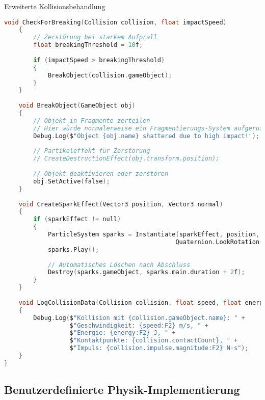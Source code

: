 \begin{code}{Erweiterte Kollisionsbehandlung}
\begin{lstlisting}[language=C, style=basesmol]
    void CheckForBreaking(Collision collision, float impactSpeed) 
    {
        // Zerstörung bei starkem Aufprall
        float breakingThreshold = 10f;
        
        if (impactSpeed > breakingThreshold) 
        {
            BreakObject(collision.gameObject);
        }
    }
    
    void BreakObject(GameObject obj) 
    {
        // Objekt in Fragmente zerteilen
        // Hier würde normalerweise ein Fragmentierungs-System aufgerufen
        Debug.Log($"Object {obj.name} shattered due to high impact!");
        
        // Partikeleffekt für Zerstörung
        // CreateDestructionEffect(obj.transform.position);
        
        // Objekt deaktivieren oder zerstören
        obj.SetActive(false);
    }
    
    void CreateSparkEffect(Vector3 position, Vector3 normal) 
    {
        if (sparkEffect != null) 
        {
            ParticleSystem sparks = Instantiate(sparkEffect, position, 
                                               Quaternion.LookRotation(normal));
            sparks.Play();
            
            // Automatisches Löschen nach Abschluss
            Destroy(sparks.gameObject, sparks.main.duration + 2f);
        }
    }
    
    void LogCollisionData(Collision collision, float speed, float energy) 
    {
        Debug.Log($"Kollision mit {collision.gameObject.name}: " +
                  $"Geschwindigkeit: {speed:F2} m/s, " +
                  $"Energie: {energy:F2} J, " +
                  $"Kontaktpunkte: {collision.contactCount}, " +
                  $"Impuls: {collision.impulse.magnitude:F2} N·s");
    }
}
\end{lstlisting}
\end{code}

\subsection{Benutzerdefinierte Physik-Implementierung}

